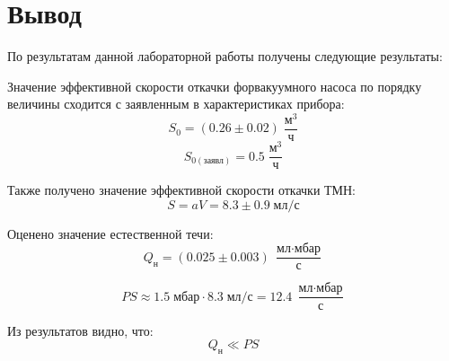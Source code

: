 \documentclass[12pt,a4paper]{article}
\begin{document}
	\section*{Вывод}
	
	По результатам данной лабораторной работы получены следующие результаты:
	
	Значение эффективной скорости откачки форвакуумного насоса по порядку величины сходится с заявленным в характеристиках прибора:
	$$S_0 = (0.26 \pm 0.02) \; \frac{\text{м}^3}{\text{ч}}$$
	$$S_{0(\text{заявл})} = 0.5 \; \frac{\text{м}^3}{\text{ч}}$$
	
	Также получено значение эффективной скорости откачки ТМН:
	$$S = aV = 8.3 \pm 0.9 \; \text{мл}/\text{с}$$
	
	Оценено значение естественной течи:
	$$Q_{\text{н}} = (0.025 \pm 0.003) \; \frac{\text{мл}\cdot\text{мбар}}{\text{с}}$$
	
	$$P S \approx 1.5 \; \text{мбар} \cdot 8.3 \; \text{мл}/\text{с} = 12.4 \; \frac{\text{мл}\cdot\text{мбар}}{\text{с}}$$
	
	Из результатов видно, что:
	$$ Q_{\text{н}} \ll PS $$
	
\end{document}
